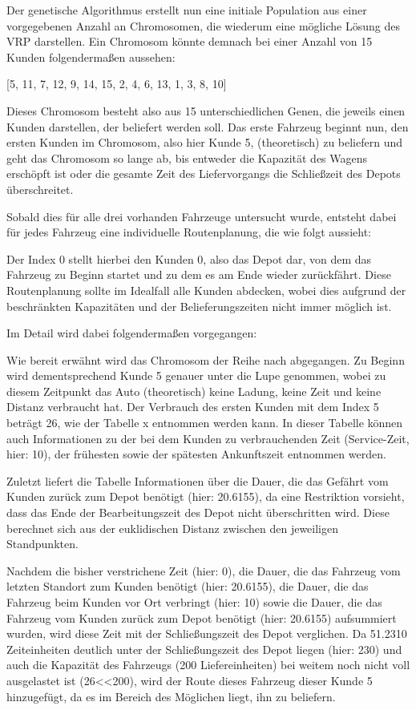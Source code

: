 \documentclass[a4paper,12pt,parskip,bibtotoc,liststotoc]{article}
\begin{document}
Der genetische Algorithmus erstellt nun eine initiale Population aus einer vorgegebenen Anzahl an Chromosomen, die wiederum eine mögliche Lösung des VRP darstellen. 
Ein Chromosom könnte demnach bei einer Anzahl von 15 Kunden folgendermaßen aussehen:

\begin{center}
[5, 11, 7, 12, 9, 14, 15, 2, 4, 6, 13, 1, 3, 8, 10]
\end{center}

Dieses Chromosom besteht also aus 15 unterschiedlichen Genen, die jeweils einen Kunden darstellen, der beliefert werden soll. 
Das erste Fahrzeug beginnt nun, den ersten Kunden im Chromosom, also hier Kunde 5, (theoretisch) zu beliefern und geht das Chromosom so lange ab, bis entweder die Kapazität des Wagens erschöpft ist oder die gesamte Zeit des Liefervorgangs die Schließzeit des Depots überschreitet.

Sobald dies für alle drei vorhanden Fahrzeuge untersucht wurde, entsteht dabei für jedes Fahrzeug eine individuelle Routenplanung, die wie folgt aussieht:

Der Index 0 stellt hierbei den Kunden 0, also das Depot dar, von dem das Fahrzeug zu Beginn startet und zu dem es am Ende wieder zurückfährt.
Diese Routenplanung sollte im Idealfall alle Kunden abdecken, wobei dies aufgrund der beschränkten Kapazitäten und der Belieferungszeiten nicht immer möglich ist. 

Im Detail wird dabei folgendermaßen vorgegangen:

Wie bereit erwähnt wird das Chromosom der Reihe nach abgegangen. 
Zu Beginn wird dementsprechend Kunde 5 genauer unter die Lupe genommen, wobei zu diesem Zeitpunkt das Auto (theoretisch) keine Ladung, keine Zeit und keine Distanz verbraucht hat.
Der Verbrauch des ersten Kunden mit dem Index 5 beträgt 26, wie der Tabelle x entnommen werden kann.
In dieser Tabelle können auch Informationen zu der bei dem Kunden zu verbrauchenden Zeit (Service-Zeit, hier: 10), der frühesten sowie der spätesten Ankunftszeit entnommen werden.

Zuletzt liefert die Tabelle Informationen über die Dauer, die das Gefährt vom Kunden zurück zum Depot benötigt (hier: 20.6155), da eine Restriktion vorsieht, dass das Ende der Bearbeitungszeit des Depot nicht überschritten wird.
Diese berechnet sich aus der euklidischen Distanz zwischen den jeweiligen Standpunkten.

Nachdem die bisher verstrichene Zeit (hier: 0), die Dauer, die das Fahrzeug vom letzten Standort zum Kunden benötigt (hier: 20.6155), die Dauer, die das Fahrzeug beim Kunden vor Ort verbringt (hier: 10) sowie die Dauer, die das Fahrzeug vom Kunden zurück zum Depot benötigt (hier: 20.6155) aufsummiert wurden, wird diese Zeit mit der Schließungszeit des Depot verglichen. 
Da 51.2310 Zeiteinheiten deutlich unter der Schließungszeit des Depot liegen (hier: 230) und auch die Kapazität des Fahrzeugs (200 Liefereinheiten) bei weitem noch nicht voll ausgelastet ist (26<<200), wird der Route dieses Fahrzeug dieser Kunde 5 hinzugefügt, da es im Bereich des Möglichen liegt, ihn zu beliefern.
\end{document}
